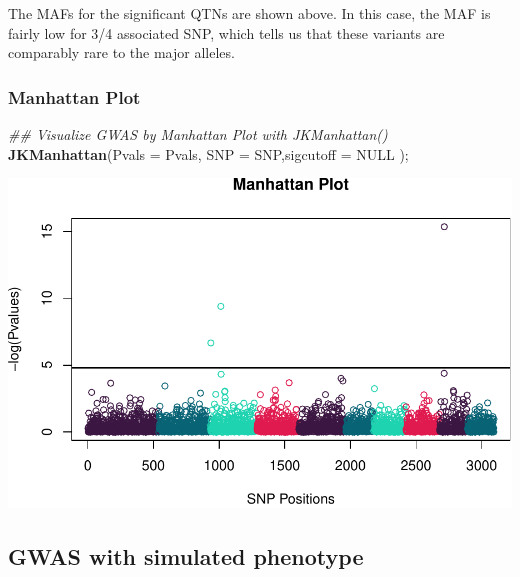 \documentclass[
]{article}
\newenvironment{Shaded}{\begin{snugshade}}{\end{snugshade}}
\newcommand{\CommentTok}[1]{\textcolor[rgb]{0.56,0.35,0.01}{\textit{#1}}}
\newcommand{\DataTypeTok}[1]{\textcolor[rgb]{0.13,0.29,0.53}{#1}}
\newcommand{\KeywordTok}[1]{\textcolor[rgb]{0.13,0.29,0.53}{\textbf{#1}}}
\newcommand{\NormalTok}[1]{#1}
\newcommand{\OtherTok}[1]{\textcolor[rgb]{0.56,0.35,0.01}{#1}}
\begin{document}
The MAFs for the significant QTNs are shown above. In this case, the MAF
is fairly low for 3/4 associated SNP, which tells us that these variants
are comparably rare to the major alleles.

\hypertarget{manhattan-plot}{%
\subsubsection{Manhattan Plot}\label{manhattan-plot}}

\begin{Shaded}
\begin{Highlighting}[]
\CommentTok{\#\# Visualize GWAS by Manhattan Plot with JKManhattan()}
\KeywordTok{JKManhattan}\NormalTok{(}\DataTypeTok{Pvals =}\NormalTok{ Pvals, }\DataTypeTok{SNP =}\NormalTok{ SNP,}\DataTypeTok{sigcutoff =} \OtherTok{NULL}\NormalTok{ );}
\end{Highlighting}
\end{Shaded}

\includegraphics{Homework4_JKGWAS_files/figure-latex/unnamed-chunk-8-1.pdf}

\hypertarget{gwas-with-simulated-phenotype}{%
\subsection{GWAS with simulated
phenotype}\label{gwas-with-simulated-phenotype}}
\end{document}
